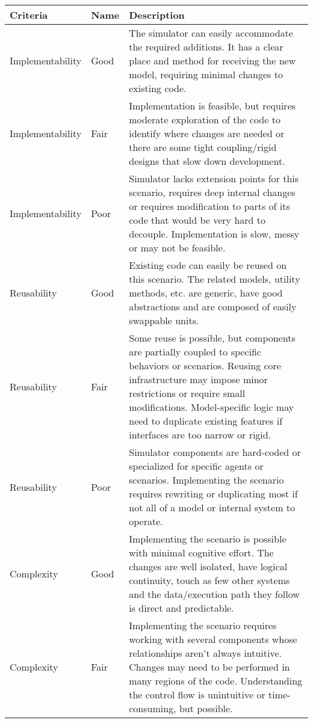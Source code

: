 \documentclass[twoside, 11pt]{article}
\begin{document}
\begin{center}
  \begin{table}
    \begin{tabularx}{\textwidth}{ | p{3.0cm} | l | X | } 
      \hline
      Criteria & Name & Description \\ 
      \hline
      Implementability & Good & 
      The simulator can easily accommodate the required additions. It has a clear place and method for receiving the new model, requiring minimal changes to existing code.
      \\ 
      \hline
      Implementability & Fair & 
      Implementation is feasible, but requires moderate exploration of the code to identify where changes are needed or there are some tight coupling/rigid designs that slow down development.
      \\ 
      \hline
      Implementability & Poor & 
      Simulator lacks extension points for this scenario, requires deep internal changes or requires modification to parts of its code that would be very hard to decouple. Implementation is slow, messy or may not be feasible.
      \\ 
      \hline
      Reusability & Good & 
      Existing code can easily be reused on this scenario. The related models, utility methods, etc. are  generic, have good abstractions and are composed of easily swappable units.
      \\ 
      \hline
      Reusability & Fair & 
      Some reuse is possible, but components are partially coupled to specific behaviors or scenarios. Reusing core infrastructure may impose minor restrictions or require small modifications. Model-specific logic may need to duplicate existing features if interfaces are too narrow or rigid.
      \\ 
      \hline
      Reusability & Poor & 
      Simulator components are hard-coded or specialized for specific agents or scenarios. Implementing the scenario requires rewriting or duplicating most if not all of a model or internal system to operate. 
      \\ 
      \hline
      Complexity & Good & 
      Implementing the scenario is possible with minimal cognitive effort. The changes are well isolated, have logical continuity, touch as few other systems and the data/execution path they follow is direct and predictable.
      \\ 
      \hline
      Complexity & Fair & 
      Implementing the scenario requires working with several components whose relationships aren't always intuitive. Changes may need to be performed in many regions of the code. Understanding the control flow is unintuitive or time-consuming, but possible.

\end{tabularx}
\end{table}
\end{center}
\end{document}
